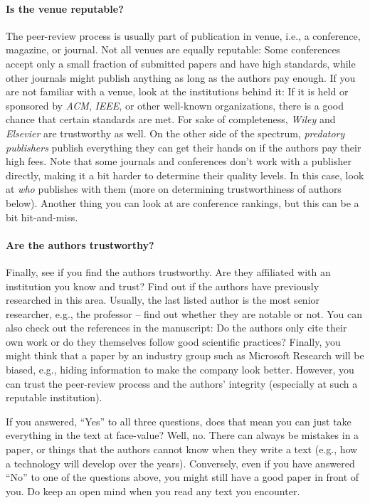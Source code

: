 \documentclass[a4]{article}
\begin{document}
\paragraph{Is the venue reputable?}
The peer-review process is usually part of publication in venue, i.e., a conference, magazine, or journal.
Not all venues are equally reputable:
Some conferences accept only a small fraction of submitted papers and have high standards, while other journals might publish anything as long as the authors pay enough.
If you are not familiar with a venue, look at the institutions behind it:
If it is held or sponsored by \emph{ACM}, \emph{IEEE}, or other well-known organizations, there is a good chance that certain standards are met.
For sake of completeness, \emph{Wiley} and \emph{Elsevier} are trustworthy as well.
On the other side of the spectrum, \emph{predatory publishers} publish everything they can get their hands on if the authors pay their high fees.
Note that some journals and conferences don't work with a publisher directly, making it a bit harder to determine their quality levels.
In this case, look at \emph{who} publishes with them (more on determining trustworthiness of authors below).
Another thing you can look at are conference rankings, but this can be a bit hit-and-miss.

\paragraph{Are the authors trustworthy?}
Finally, see if you find the authors trustworthy.
Are they affiliated with an institution you know and trust?
Find out if the authors have previously researched in this area.
Usually, the last listed author is the most senior researcher, e.g., the professor -- find out whether they are notable or not.
You can also check out the references in the manuscript:
Do the authors only cite their own work or do they themselves follow good scientific practices?
Finally, you might think that a paper by an industry group such as Microsoft Research will be biased, e.g., hiding information to make the company look better.
However, you can trust the peer-review process and the authors' integrity (especially at such a reputable institution).

If you answered, ``Yes'' to all three questions, does that mean you can just take everything in the text at face-value?
Well, no.
There can always be mistakes in a paper, or things that the authors cannot know when they write a text (e.g., how a technology will develop over the years).
Conversely, even if you have answered ``No'' to one of the questions above, you might still have a good paper in front of you.
Do keep an open mind when you read any text you encounter.
\end{document}
